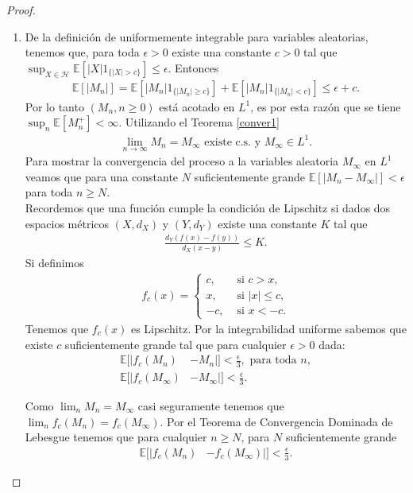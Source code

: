 \begin{proof}
\begin{enumerate}
\item De la definición de uniformemente integrable para variables aleatorias, tenemos que, para toda $\epsilon > 0$ existe una constante $c > 0$ tal que $\sup_{X \in \mathcal{H}} \mathbb{E} [ |X| 1_{ \{|X| > c\} } ] \leq \epsilon$. Entonces
	\begin{align*}
	\mathbb{E}[|M_n|] = \mathbb{E} \left[ |M_n|1_{ \{|M_n| \geq c\} } \right] + \mathbb{E} \left[ |M_n|1_{ \{|M_n| < c\} } \right] \leq \epsilon + c.
	\end{align*}
Por lo tanto $(M_n, n \geq 0)$ está acotado en $L^1$, es por esta razón que se tiene $\sup_n \mathbb{E}[M_n^{+}] < \infty$. Utilizando el Teorema \ref{conver1} 
	\begin{align*}
	\lim_{n \rightarrow \infty} M_n = M_{\infty} \text{ existe c.s. y } M_{\infty} \in L^1.
	\end{align*}
Para mostrar la convergencia del proceso a la variables aleatoria $M_{\infty}$ en $L^1$ veamos que para una constante $N$ suficientemente grande $\mathbb{E}[|M_n - M_{\infty}|] < \epsilon$ para toda $n \geq N$. \\

Recordemos que una función cumple la condición de Lipschitz si \cite[p.~169]{bartle} dados dos espacios métricos $(X, d_X)$ y $(Y, d_Y)$ existe una constante $K$ tal que
	\begin{align*}
	\frac{d_Y(f(x) - f(y))}{d_X(x - y)} \leq K.
	\end{align*}
Si definimos 
	\begin{align*}
	f_c(x) = 
	\begin{cases}
	c, & \text{ si } c > x, \\
	x, & \text{ si } |x| \leq c, \\
	-c, & \text{ si } x < -c.
	\end{cases}
	\end{align*}
Tenemos que $f_c(x)$ es Lipschitz. Por la integrabilidad uniforme sabemos que existe $c$ suficientemente grande tal que para cualquier $\epsilon > 0$ dada:
	\begin{align}
	\mathbb{E}[ |f_c(M_n) & - M_n|] < \frac{\epsilon}{3}, \text{ para toda } n, \label{aas} \\
	\mathbb{E}[ |f_c(M_{\infty}) & - M_{\infty}|] < \frac{\epsilon}{3}. \label{aat}
	\end{align}
	
Como $\lim_n M_n = M_{\infty}$ casi seguramente tenemos que $\lim_n f_c(M_n) = f_c(M_{\infty})$. Por el Teorema de Convergencia Dominada de Lebesgue \cite[p.~52]{jacodprotter} tenemos que para cualquier $n \geq N$, para $N$ suficientemente grande
	\begin{align}
	\mathbb{E} [ | f_c(M_n) & - f_c(M_{\infty}) |] < \frac{\epsilon}{3}. \label{aau}
	\end{align}


\end{enumerate}
\end{proof}
